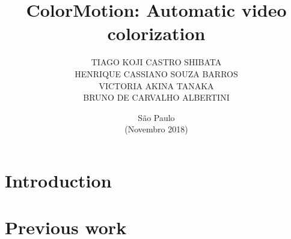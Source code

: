 \documentclass[12pt,openright,twoside,a4paper,brazil]{abntex2}
\author{TIAGO KOJI CASTRO SHIBATA\\
HENRIQUE CASSIANO SOUZA BARROS\\
VICTORIA AKINA TANAKA\\
BRUNO DE CARVALHO ALBERTINI}
\title{ColorMotion: Automatic video colorization}
\date{São Paulo\\(Novembro 2018)}
\begin{document}
\imprimircapa
\imprimirfalsafolhaderosto
\imprimirfolhaderosto

\maketitle

\section{Introduction}

\section{Previous work}
\end{document}
